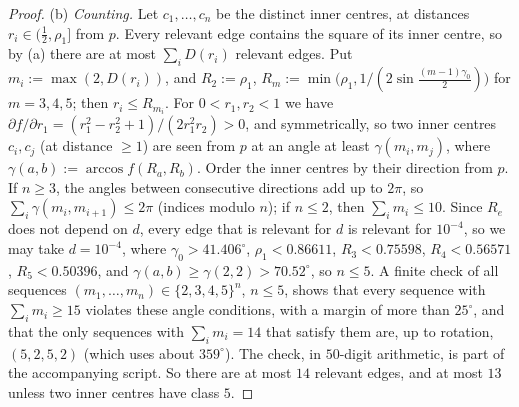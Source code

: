 \documentclass[11pt]{amsart}
\theoremstyle{definition}
\theoremstyle{remark}
\begin{document}
\begin{proof}
(b) \emph{Counting.} Let $c_1,\dots,c_n$ be the distinct inner centres, at distances $r_i\in(\frac12,\rho_1]$ from $p$. Every relevant
edge contains the square of its inner centre, so by (a) there are at most $\sum_iD(r_i)$ relevant edges. Put $m_i:=\max(2,D(r_i))$, and
$R_2:=\rho_1$, $R_m:=\min\big(\rho_1,1/(2\sin\frac{(m-1)\gamma_0}2)\big)$ for $m=3,4,5$; then $r_i\le R_{m_i}$. For $0<r_1,r_2<1$ we have
$\partial f/\partial r_1=(r_1^2-r_2^2+1)/(2r_1^2r_2)>0$, and symmetrically, so two inner centres $c_i,c_j$ (at distance $\ge1$) are seen
from $p$ at an angle at least $\gamma(m_i,m_j)$, where $\gamma(a,b):=\arccos f(R_a,R_b)$. Order the inner centres by their direction
from $p$. If $n\ge3$, the angles between consecutive directions add up to $2\pi$, so $\sum_{i}\gamma(m_i,m_{i+1})\le2\pi$ (indices
modulo $n$); if $n\le2$, then $\sum_im_i\le10$. Since $R_e$ does not depend on $d$, every edge that is relevant for $d$ is relevant
for $10^{-4}$, so we may take $d=10^{-4}$, where
$\gamma_0>41.406^\circ$, $\rho_1<0.86611$, $R_3<0.75598$, $R_4<0.56571$, $R_5<0.50396$, and $\gamma(a,b)\ge\gamma(2,2)>70.52^\circ$, so
$n\le5$. A finite check of all sequences $(m_1,\dots,m_n)\in\{2,3,4,5\}^n$, $n\le5$, shows that every sequence with
$\sum_im_i\ge15$ violates these angle conditions, with a margin of more than $25^\circ$, and that the only sequences with
$\sum_im_i=14$ that satisfy them are, up to rotation, $(5,2,5,2)$ (which uses about $359^\circ$). The check, in $50$-digit
arithmetic, is part of the accompanying script. So there are at most $14$ relevant edges, and at most $13$ unless two inner
centres have class $5$.


\end{proof}
\end{document}
